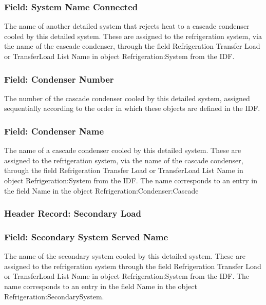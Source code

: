 \subsubsection{Field: System Name Connected}\label{field-system-name-connected}

The name of another detailed system that rejects heat to a cascade condenser cooled by this detailed system. These are assigned to the refrigeration system, via the name of the cascade condenser, through the field Refrigeration Transfer Load or TransferLoad List Name in object Refrigeration:System from the IDF.

\subsubsection{Field: Condenser Number}\label{field-condenser-number}

The number of the cascade condenser cooled by this detailed system, assigned sequentially according to the order in which these objects are defined in the IDF.

\subsubsection{Field: Condenser Name}\label{field-condenser-name}

The name of a cascade condenser cooled by this detailed system. These are assigned to the refrigeration system, via the name of the cascade condenser, through the field Refrigeration Transfer Load or TransferLoad List Name in object Refrigeration:System from the IDF. The name corresponds to an entry in the field Name in the object Refrigeration:Condenser:Cascade

\subsubsection{Header Record: Secondary Load}\label{header-record-secondary-load}

\subsubsection{Field: Secondary System Served Name}\label{field-secondary-system-served-name}

The name of the secondary system cooled by this detailed system. These are assigned to the refrigeration system through the field Refrigeration Transfer Load or TransferLoad List Name in object Refrigeration:System from the IDF. The name corresponds to an entry in the field Name in the object Refrigeration:SecondarySystem.

